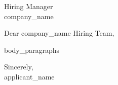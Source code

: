 \documentclass[11pt]{letter}
\begin{document}
\begin{letter}{Hiring Manager\\ {{company_name}}}
\opening{Dear {{company_name}} Hiring Team,}

{{body_paragraphs}}

\closing{Sincerely,\\ {{applicant_name}}}
\end{letter}
\end{document}
